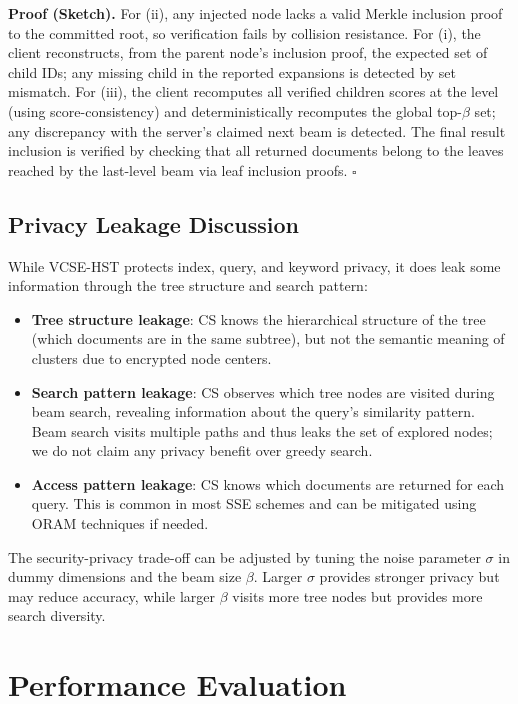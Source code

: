 \documentclass[journal]{IEEEtran}
\begin{document}
\textbf{Proof (Sketch).} For (ii), any injected node lacks a valid Merkle inclusion proof to the committed root, so verification fails by collision resistance. For (i), the client reconstructs, from the parent node’s inclusion proof, the expected set of child IDs; any missing child in the reported expansions is detected by set mismatch. For (iii), the client recomputes all verified children scores at the level (using score-consistency) and deterministically recomputes the global top-$\beta$ set; any discrepancy with the server’s claimed next beam is detected. The final result inclusion is verified by checking that all returned documents belong to the leaves reached by the last-level beam via leaf inclusion proofs. \hfill $\square$

\subsection{Privacy Leakage Discussion}

While VCSE-HST protects index, query, and keyword privacy, it does leak some information through the tree structure and search pattern:

\begin{itemize}
    \item \textbf{Tree structure leakage}: CS knows the hierarchical structure of the tree (which documents are in the same subtree), but not the semantic meaning of clusters due to encrypted node centers.
    
    \item \textbf{Search pattern leakage}: CS observes which tree nodes are visited during beam search, revealing information about the query's similarity pattern. Beam search visits multiple paths and thus leaks the set of explored nodes; we do not claim any privacy benefit over greedy search.
    
    \item \textbf{Access pattern leakage}: CS knows which documents are returned for each query. This is common in most SSE schemes and can be mitigated using ORAM techniques if needed.
\end{itemize}

The security-privacy trade-off can be adjusted by tuning the noise parameter $\sigma$ in dummy dimensions and the beam size $\beta$. Larger $\sigma$ provides stronger privacy but may reduce accuracy, while larger $\beta$ visits more tree nodes but provides more search diversity.
\section{Performance Evaluation}
\label{sec:evaluation}
\end{document}
